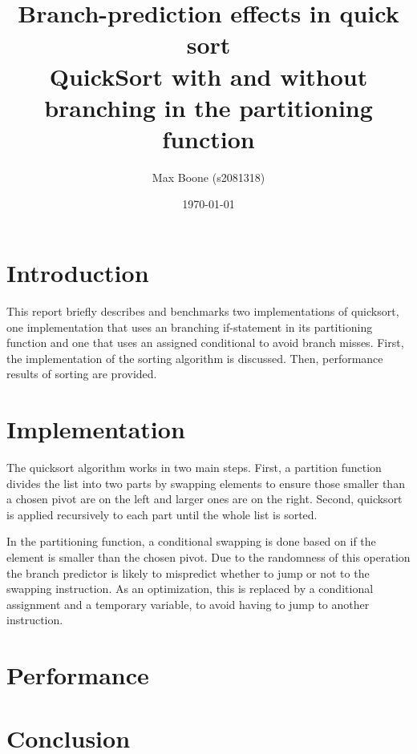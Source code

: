 \documentclass[a4paper,10pt]{article}
\title{
  Branch-prediction effects in quick sort \\
\small QuickSort with and without branching in the partitioning function}
\author{Max Boone (s2081318)}
\date{\today}
\begin{document}
\maketitle

\section{Introduction}

This report briefly describes and benchmarks two implementations of
quicksort, one implementation that uses an branching if-statement in
its partitioning function and one that uses an assigned conditional
to avoid branch misses. First, the implementation of the sorting
algorithm is discussed. Then, performance results of sorting are
provided.

\section{Implementation}

The quicksort algorithm works in two main steps. First, a partition
function divides the list into two parts by swapping elements to
ensure those smaller than a chosen pivot are on the left and larger
ones are on the right. Second, quicksort is applied recursively to
each part until the whole list is sorted.

In the partitioning function, a conditional swapping is done based on
if the element is smaller than the chosen pivot. Due to the randomness
of this operation the branch predictor is likely to mispredict whether
to jump or not to the swapping instruction. As an optimization, this is
replaced by a conditional assignment and a temporary variable, to avoid
having to jump to another instruction.

\section{Performance}



\section{Conclusion}
\end{document}
